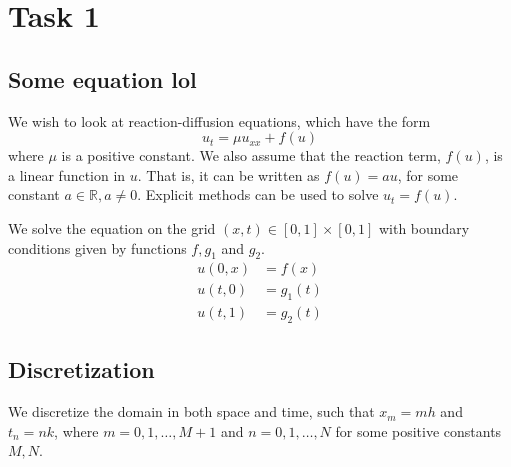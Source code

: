 \section{Task 1}

\subsection{Some equation lol}

We wish to look at reaction-diffusion equations, which have the form
\begin{equation}
    \label{eq:original_eq}
     u_t = \mu u_{xx} + f(u)
\end{equation}
where $\mu$ is a positive constant.
We also assume that the reaction term,
$f(u)$, is a linear function in \( u \).
That is, it can be written as \( f(u) = au \),
for some constant \( a \in \mathbb{R}, a \neq 0 \).
Explicit methods can be used to solve $u_t = f(u)$.

We solve the equation on
the grid \( (x, t) \in [0, 1] \times [0, 1] \)
with boundary conditions given by functions
\( f, g_1 \) and \( g_2 \).
\begin{align*}
  u(0, x) &= f(x) \\
  u(t, 0) &= g_1(t) \\
  u(t, 1) &= g_2(t)
\end{align*}

\subsection{Discretization}

We discretize the domain in both space and time,
such that $x_m = mh$ and $t_n = nk$,
where \( m = 0, 1, \dots, M + 1\) and \( n = 0, 1, \dots, N \)
for some positive constants \( M, N \).

